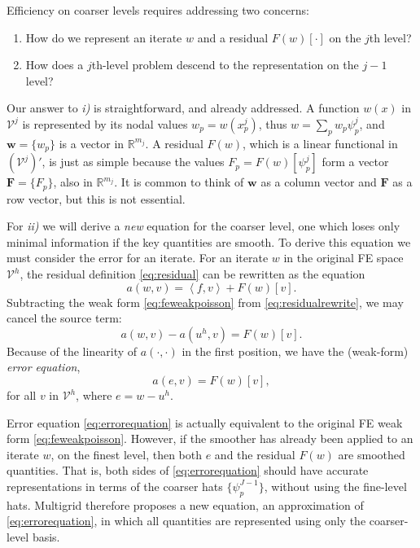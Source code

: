 \documentclass[letterpaper,final,12pt,reqno]{amsart}
\theoremstyle{claim}
\newcommand{\RR}{\mathbb{R}}
\newcommand{\bw}{\mathbf{w}}
\newcommand{\bF}{\mathbf{F}}
\newcommand{\ip}[2]{\left<#1,#2\right>}
\numberwithin{equation}{section}
\numberwithin{figure}{section}
\numberwithin{table}{section}
\numberwithin{theorem}{section}
\begin{document}
Efficiency on coarser levels requires addressing two concerns:
\renewcommand{\labelenumi}{\emph{\roman{enumi})}}
\begin{enumerate}
\item How do we represent an iterate $w$ and a residual $F(w)[\cdot]$ on the $j$th level?
\item How does a $j$th-level problem descend to the representation on the $j-1$ level?
\end{enumerate}

Our answer to \emph{i)} is straightforward, and already addressed.  A function $w(x)$ in $\mathcal{V}^j$ is represented by its nodal values $w_p=w(x_p^j)$, thus $w = \sum_p w_p \psi_p^j$, and $\bw = \{w_p\}$ is a vector in $\RR^{m_j}$.  A residual $F(w)$, which is a linear functional in $(\mathcal{V}^j)'$, is just as simple because the values $F_p = F(w)[\psi_p^j]$ form a vector $\bF=\{F_p\}$, also in $\RR^{m_j}$.  It is common to think of $\bw$ as a column vector and $\bF$ as a row vector, but this is not essential.

For \emph{ii)} we will derive a \emph{new} equation for the coarser level, one which loses only minimal information if the key quantities are smooth.  To derive this equation we must consider the error for an iterate.  For an iterate $w$ in the original FE space $\mathcal{V}^h$, the residual definition \eqref{eq:residual} can be rewritten as the equation
\begin{equation}
  a(w,v) = \ip{f}{v} + F(w)[v].  \label{eq:residualrewrite}
\end{equation}
Subtracting the weak form \eqref{eq:feweakpoisson} from \eqref{eq:residualrewrite}, we may cancel the source term:
\begin{equation}
  a(w,v) - a(u^h,v) = F(w)[v].  \label{eq:errorequationearly}
\end{equation}
Because of the linearity of $a(\cdot,\cdot)$ in the first position, we have the (weak-form) \emph{error equation},
\begin{equation}
  a(e,v) = F(w)[v],  \label{eq:errorequation}
\end{equation}
for all $v$ in $\mathcal{V}^h$, where $e=w-u^h$.

Error equation \eqref{eq:errorequation} is actually equivalent to the original FE weak form \eqref{eq:feweakpoisson}.  However, if the smoother has already been applied to an iterate $w$, on the finest level, then both $e$ and the residual $F(w)$ are smoothed quantities.  That is, both sides of \eqref{eq:errorequation} should have accurate representations in terms of the coarser hats $\{\psi_p^{J-1}\}$, without using the fine-level hats.  Multigrid therefore proposes a new equation, an approximation of \eqref{eq:errorequation}, in which all quantities are represented using only the coarser-level basis.
\end{document}
